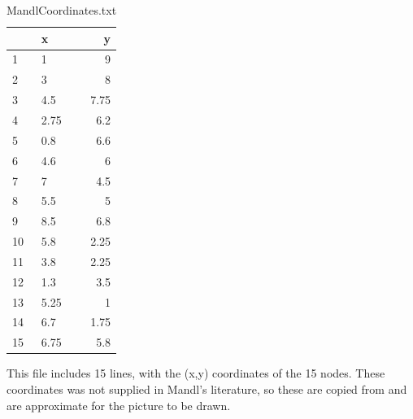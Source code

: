 \begin{table}[H]
    \begin{center}
        \begin{tabular}{|l|lr|}
     	\hline
     	~ & x & y \\
     	\hline
        1 & 1 & 9 \\
        2 & 3 & 8 \\
        3 & 4.5 & 7.75 \\
        4 & 2.75 & 6.2 \\
        5 & 0.8 & 6.6 \\
        6 & 4.6 & 6 \\
        7 & 7 & 4.5 \\
        8 & 5.5 & 5 \\
        9 & 8.5 & 6.8 \\
        10 & 5.8 & 2.25 \\
        11 & 3.8 & 2.25 \\
        12 & 1.3 & 3.5 \\
    	13 & 5.25 & 1 \\
    	14 & 6.7 & 1.75 \\
    	15 & 6.75 & 5.8 \\
    	\hline
        \end{tabular}
    \end{center}
    \caption {MandlCoordinates.txt}
    \label{table:MandlCoords}
    This file includes 15 lines, with the (x,y) coordinates of the 15 nodes. These coordinates was not supplied in Mandl's literature, so these are copied from \citet{mumford13} and are approximate for the picture to be drawn.
\end{table}


